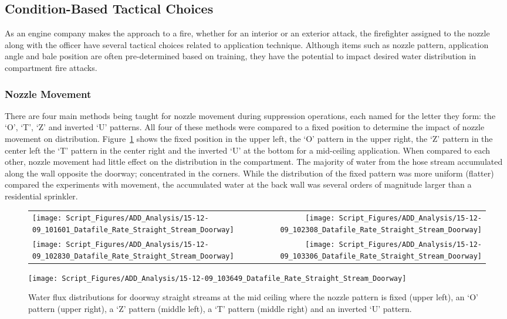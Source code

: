 \documentclass[12pt,oneside]{book}
\begin{document}
\subsection{Condition-Based Tactical Choices}
As an engine company makes the approach to a fire, whether for an interior or an exterior attack, the firefighter assigned to the nozzle along with the officer have several tactical choices related to application technique. Although items such as nozzle pattern, application angle and bale position are often pre-determined based on training, they have the potential to impact desired water distribution in compartment fire attacks. 

\subsubsection{Nozzle Movement}
There are four main methods being taught for nozzle movement during suppression operations, each named for the letter they form: the `O', `T', `Z' and inverted `U' patterns. All four of these methods were compared to a fixed position to determine the impact of nozzle movement on distribution. Figure~\ref{fig:Nozzle Movements Example, First Floor Doorway} shows the fixed position in the upper left, the `O' pattern in the upper right, the `Z' pattern in the center left the `T' pattern in the center right and the inverted `U' at the bottom for a mid-ceiling application. When compared to each other, nozzle movement had little effect on the distribution in the compartment. The majority of water from the hose stream accumulated along the wall opposite the doorway; concentrated in the corners. While the distribution of the fixed pattern was more uniform (flatter) compared the experiments with movement, the accumulated water at the back wall was several orders of magnitude larger than a residential sprinkler. 

\begin{figure}[ht]
\begin{tabular*}{\textwidth}{lr}
\texttt{[image: Script\_Figures/ADD\_Analysis/15-12-09\_101601\_Datafile\_Rate\_Straight\_Stream\_Doorway]} &
\texttt{[image: Script\_Figures/ADD\_Analysis/15-12-09\_102308\_Datafile\_Rate\_Straight\_Stream\_Doorway]} \\
\texttt{[image: Script\_Figures/ADD\_Analysis/15-12-09\_102830\_Datafile\_Rate\_Straight\_Stream\_Doorway]} &
\texttt{[image: Script\_Figures/ADD\_Analysis/15-12-09\_103306\_Datafile\_Rate\_Straight\_Stream\_Doorway]} \\
\end{tabular*}
\centering
\texttt{[image: Script\_Figures/ADD\_Analysis/15-12-09\_103649\_Datafile\_Rate\_Straight\_Stream\_Doorway]}
\caption[Straight Stream Varied Nozzle Movements, First Floor Doorway]{Water flux distributions for doorway straight streams at the mid ceiling where the nozzle pattern is fixed (upper left), an `O' pattern (upper right), a `Z' pattern (middle left), a `T' pattern (middle right) and an inverted `U' pattern. }
\label{fig:Nozzle Movements Example, First Floor Doorway}
\end{figure}
\end{document}
